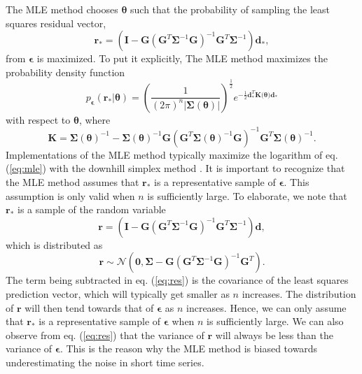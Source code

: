 \documentclass{svjour3}                     %
\begin{document}
The MLE method chooses $\mathbf{\theta}$ such that the probability of sampling the least squares residual vector,
\begin{equation}
  \mathbf{r}_* =  \left(\mathbf{I} - 
                  \mathbf{G}\left(\mathbf{G}^T\mathbf{\Sigma}^{-1}
                  \mathbf{G}\right)^{-1}\mathbf{G}^T\mathbf{\Sigma}^{-1}\right)
                  \mathbf{d_*},
\end{equation}  
from $\mathbf{\epsilon}$ is maximized. To put it explicitly, The MLE method maximizes the probability density function
\begin{equation}\label{eq:mle}
p_\mathbf{\epsilon}(\mathbf{r}_*|\mathbf{\theta}) = 
\left(\frac{1}{(2\pi)^n\left| \mathbf{\Sigma}(\mathbf{\theta}) \right|}\right)^{\frac{1}{2}} 
e^{-\tfrac{1}{2}\mathbf{d}_*^T\mathbf{K(\mathbf{\theta}})\mathbf{d}_*}
\end{equation}
with respect to $\mathbf{\theta}$, where
\begin{equation}
\mathbf{K} = \mathbf{\Sigma}(\mathbf{\theta})^{-1} - 
             \mathbf{\Sigma}(\mathbf{\theta})^{-1}\mathbf{G}
             \left(\mathbf{G}^T\mathbf{\Sigma}(\mathbf{\theta})^{-1}\mathbf{G}\right)^{-1}
             \mathbf{G}^T\mathbf{\Sigma}(\mathbf{\theta})^{-1}.
\end{equation}
Implementations of the MLE method typically maximize the logarithm of eq. (\ref{eq:mle}) with the downhill simplex method \citep{Press2007}. It is important to recognize that the MLE method assumes that $\mathbf{r}_*$ is a representative sample of $\mathbf{\epsilon}$. This assumption is only valid when $n$ is sufficiently large. To elaborate, we note that $\mathbf{r_*}$ is a sample of the random variable
\begin{equation}
  \mathbf{r} =  \left(\mathbf{I} - 
                \mathbf{G}\left(\mathbf{G}^T\mathbf{\Sigma}^{-1}\mathbf{G}\right)^{-1}
                \mathbf{G}^T\mathbf{\Sigma}^{-1}\right)\mathbf{d},
\end{equation}  
which is distributed as
\begin{equation}\label{eq:res}
  \mathbf{r} \sim \mathcal{N}\left(\mathbf{0},
                  \mathbf{\Sigma} - 
                  \mathbf{G}\left(\mathbf{G}^T\mathbf{\Sigma}^{-1}
                  \mathbf{G}\right)^{-1}\mathbf{G}^T\right).
\end{equation}
The term being subtracted in eq. (\ref{eq:res}) is the covariance of the least squares prediction vector, which will typically get smaller as $n$ increases. The distribution of $\mathbf{r}$ will then tend towards that of $\mathbf{\epsilon}$ as $n$ increases. Hence, we can only assume that $\mathbf{r}_*$ is a representative sample of $\mathbf{\epsilon}$ when $n$ is sufficiently large. We can also observe from eq. (\ref{eq:res}) that the variance of $\mathbf{r}$ will always be less than the variance of $\mathbf{\epsilon}$. This is the reason why the MLE method is biased towards underestimating the noise in short time series.
\end{document}
